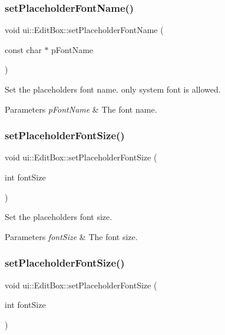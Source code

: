 \subsubsection{\texorpdfstring{set\+Placeholder\+Font\+Name()}{setPlaceholderFontName()}\hspace{0.1cm}{\footnotesize\ttfamily [2/2]}}
{\footnotesize\ttfamily void ui\+::\+Edit\+Box\+::set\+Placeholder\+Font\+Name (\begin{DoxyParamCaption}\item[{const char $\ast$}]{p\+Font\+Name }\end{DoxyParamCaption})}

Set the placeholder\textquotesingle{}s font name. only system font is allowed. 
\begin{DoxyParams}{Parameters}
{\em p\+Font\+Name} & The font name. \\
\hline
\end{DoxyParams}
\mbox{\label{classui_1_1EditBox_a8460f548f82512af8286b384a8c8bcab}} 
\subsubsection{\texorpdfstring{set\+Placeholder\+Font\+Size()}{setPlaceholderFontSize()}\hspace{0.1cm}{\footnotesize\ttfamily [1/2]}}
{\footnotesize\ttfamily void ui\+::\+Edit\+Box\+::set\+Placeholder\+Font\+Size (\begin{DoxyParamCaption}\item[{int}]{font\+Size }\end{DoxyParamCaption})}

Set the placeholder\textquotesingle{}s font size. 
\begin{DoxyParams}{Parameters}
{\em font\+Size} & The font size. \\
\hline
\end{DoxyParams}
\mbox{\label{classui_1_1EditBox_a8460f548f82512af8286b384a8c8bcab}} 
\subsubsection{\texorpdfstring{set\+Placeholder\+Font\+Size()}{setPlaceholderFontSize()}\hspace{0.1cm}{\footnotesize\ttfamily [2/2]}}
{\footnotesize\ttfamily void ui\+::\+Edit\+Box\+::set\+Placeholder\+Font\+Size (\begin{DoxyParamCaption}\item[{int}]{font\+Size }\end{DoxyParamCaption})}

